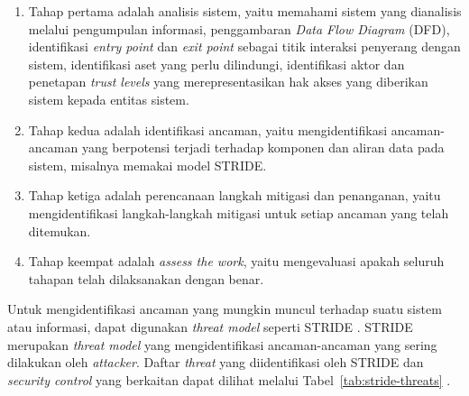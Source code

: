\begin{enumerate}
    \item Tahap pertama adalah analisis sistem, yaitu memahami sistem yang dianalisis melalui pengumpulan informasi, penggambaran \textit{Data Flow Diagram} (DFD), identifikasi \textit{entry point} dan \textit{exit point} sebagai titik interaksi penyerang dengan sistem, identifikasi aset yang perlu dilindungi, identifikasi aktor dan penetapan \textit{trust levels} yang merepresentasikan hak akses yang diberikan sistem kepada entitas sistem.
    \item Tahap kedua adalah identifikasi ancaman, yaitu mengidentifikasi ancaman-ancaman yang berpotensi terjadi terhadap komponen dan aliran data pada sistem, misalnya memakai model STRIDE\@.
    \item Tahap ketiga adalah perencanaan langkah mitigasi dan penanganan, yaitu mengidentifikasi langkah-langkah mitigasi untuk setiap ancaman yang telah ditemukan.
    \item Tahap keempat adalah \textit{assess the work}, yaitu mengevaluasi apakah seluruh tahapan telah dilaksanakan dengan benar.
\end{enumerate}

Untuk mengidentifikasi ancaman yang mungkin muncul terhadap suatu sistem atau informasi, dapat digunakan \textit{threat model} seperti STRIDE \parencite{owaspThreatModelingProcess}.
STRIDE merupakan \textit{threat model} yang mengidentifikasi ancaman-ancaman yang sering dilakukan oleh \textit{attacker}.
Daftar \textit{threat} yang diidentifikasi oleh STRIDE dan \textit{security control} yang berkaitan dapat dilihat melalui Tabel~\ref{tab:stride-threats} \parencite{owaspThreatModelingProcess}.

